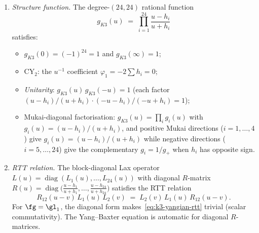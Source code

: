 \begin{theorem}
\begin{enumerate}[label=\textup{(\roman*)}]
\item \emph{Structure function.}
The degree-$(24,24)$ rational function
\begin{equation}\label{eq:k3-yangian-structure-fn}
  g_{K3}(u) \;=\; \prod_{i=1}^{24}
  \frac{u - h_i}{u + h_i}
\end{equation}
satisfies:
\begin{itemize}
  \item $g_{K3}(0) = (-1)^{24} = 1$ and $g_{K3}(\infty) = 1$;
  \item CY$_2$: the $u^{-1}$ coefficient $\varphi_1 = -2\sum h_i = 0$;
  \item \emph{Unitarity}: $g_{K3}(u)\, g_{K3}(-u) = 1$
    (each factor $(u-h_i)/(u+h_i) \cdot (-u-h_i)/(-u+h_i) = 1$);
  \item Mukai-diagonal factorisation: $g_{K3}(u) = \prod_i g_i(u)$
    with $g_i(u) = (u - h_i)/(u + h_i)$, and positive Mukai directions
    ($i = 1,\ldots,4$) give $g_i(u) = (u-h_i)/(u+h_i)$ while negative
    directions ($i = 5,\ldots,24$) give the complementary
    $g_i = 1/g_+$ when $h_i$ has opposite sign.
\end{itemize}

\item \emph{RTT relation.}
The block-diagonal Lax operator
$L(u) = \operatorname{diag}(L_1(u), \ldots, L_{24}(u))$
with diagonal $R$-matrix
$R(u) = \operatorname{diag}\bigl(\tfrac{u-h_1}{u+h_1},\ldots,
\tfrac{u-h_{24}}{u+h_{24}}\bigr)$
satisfies the RTT relation
\begin{equation}\label{eq:k3-yangian-rtt}
  R_{12}(u-v)\, L_1(u)\, L_2(v) \;=\;
  L_2(v)\, L_1(u)\, R_{12}(u-v).
\end{equation}
For $\fg = \gl_1$, the diagonal form makes~\eqref{eq:k3-yangian-rtt}
trivial (scalar commutativity).
The Yang--Baxter equation is automatic for diagonal $R$-matrices.


\end{enumerate}
\end{theorem}
